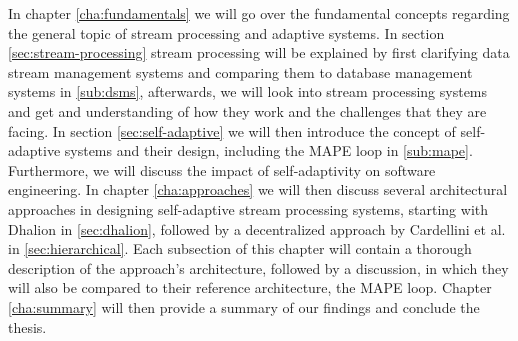 In chapter \ref{cha:fundamentals} we will go over the fundamental concepts regarding the general topic of stream processing and adaptive systems.
In section \ref{sec:stream-processing} stream processing will be explained by first clarifying data stream management systems and comparing them to database management systems 
in \ref{sub:dsms}, afterwards, we will look into stream processing systems and get and understanding of how they work and the challenges that they are facing.
In section \ref{sec:self-adaptive} we will then introduce the concept of self-adaptive systems and their design, including the MAPE loop in \ref{sub:mape}. 
Furthermore, we will discuss the impact of self-adaptivity on software engineering.
In chapter \ref{cha:approaches} we will then discuss several architectural approaches in designing self-adaptive stream processing systems, starting with Dhalion in \ref{sec:dhalion}, 
followed by a decentralized approach by Cardellini et al. in \ref{sec:hierarchical}.
Each subsection of this chapter will contain a thorough description of the approach's architecture, followed by a discussion, 
in which they will also be compared to their reference architecture, the MAPE loop.
Chapter \ref{cha:summary} will then provide a summary of our findings and conclude the thesis.